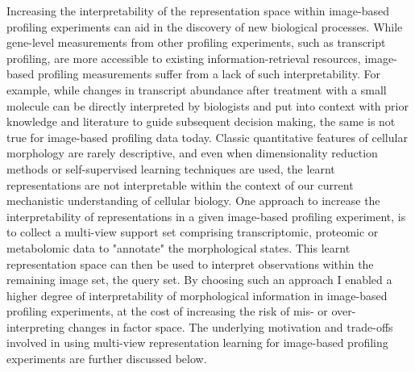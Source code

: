 \begin{flushleft}
Increasing the interpretability of the representation space within image-based profiling experiments can aid in the discovery of new biological processes. While gene-level measurements from other profiling experiments, such as transcript profiling, are more accessible to existing information-retrieval resources, image-based profiling measurements suffer from a lack of such interpretability. For example, while changes in transcript abundance after treatment with a small molecule can be directly interpreted by biologists and put into context with prior knowledge and literature to guide subsequent decision making, the same is not true for image-based profiling data today. Classic quantitative features of cellular morphology are rarely descriptive, and even when dimensionality reduction methods or self-supervised learning techniques are used, the learnt representations are not interpretable within the context of our current mechanistic understanding of cellular biology. One approach to increase the interpretability of representations in a given image-based profiling experiment, is to collect a multi-view support set comprising transcriptomic, proteomic or metabolomic data to "annotate" the morphological states. This learnt representation space can then be used to interpret observations within the remaining image set, the query set. By choosing such an approach I enabled a higher degree of interpretability of morphological information in image-based profiling experiments, at the cost of increasing the risk of mis- or over-interpreting changes in factor space. The underlying motivation and trade-offs involved in using multi-view representation learning for image-based profiling experiments are further discussed below. 
\bigbreak


\end{flushleft}
